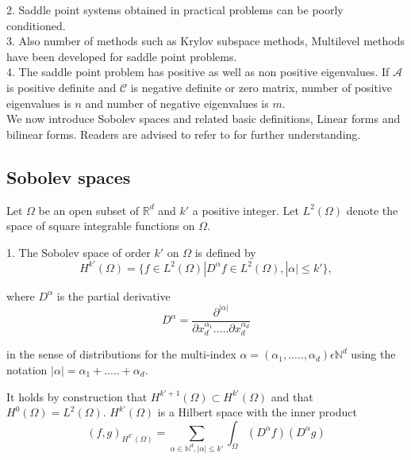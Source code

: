 \documentclass[a4paper,openany]{book}
\begin{document}
\begin{appendices}
2. Saddle point systems obtained in practical problems can be poorly conditioned.\\

3. Also number of methods such as Krylov subspace methods, Multilevel methods have been developed for saddle point problems.\\

4. The saddle point problem has positive as well as non positive eigenvalues. If $\mathcal{A}$ is positive definite and $\mathcal{C}$ is negative definite or zero matrix, number of positive eigenvalues is $n$ and number of negative eigenvalues is $m$. \\

We now introduce Sobolev spaces and related basic definitions, Linear forms and bilinear forms. Readers are advised to refer to \cite{crbm} for further understanding.

\subsection{Sobolev spaces} 

Let $\Omega$ be an open subset of $\mathbb{R}^d$ and $k'$ a positive integer. Let $L^2(\Omega)$ denote the space of square integrable functions on $\Omega$. 

1. The Sobolev space of order $k'$ on $\Omega$ is defined by\\
\begin{equation}
H^{k'} (\Omega) = \lbrace f \in L^2 (\Omega) | D^\alpha f \in L^2 (\Omega), |\alpha| \leq k' \rbrace ,
\end{equation} 

where $D^\alpha$ is the partial derivative
\begin{equation}
D^\alpha = \frac{\partial^{|\alpha|}}{\partial x_d^{\alpha_1} ..... \partial x_d^{\alpha_d}}
\end{equation}

in the sense of distributions for the multi-index $\alpha = (\alpha_1,.....,\alpha_d) \epsilon \mathbb{N}^d$ using the notation $|\alpha| = \alpha_1 + ..... + \alpha_d $.

It holds by construction that $H^{k'+1}(\Omega) \subset H^{k'} (\Omega)$ and that $H^0 (\Omega) = L^2 (\Omega)$. $H^{k'}(\Omega)$ is a Hilbert space with the inner product
\begin{equation}
(f,g)_{H^{k'}(\Omega)} = \sum_{\alpha \in \mathbb{N}^d, |\alpha| \leq k'} \int_\Omega (D^\alpha f) (D^\alpha g)
\end{equation}


\end{appendices}
\end{document}
